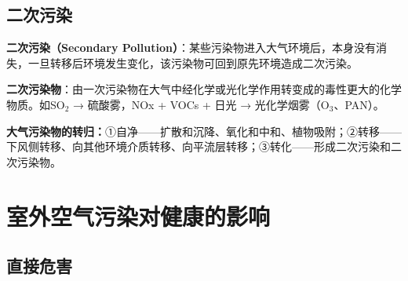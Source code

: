 \documentclass[10pt,a4paper,oneside]{ctexbook}
\begin{document}
\subsection{二次污染}

\begin{defbox}
\textbf{二次污染（Secondary Pollution）}：某些污染物进入大气环境后，本身没有消失，一旦转移后环境发生变化，该污染物可回到原先环境造成二次污染。

\textbf{二次污染物}：由一次污染物在大气中经化学或光化学作用转变成的毒性更大的化学物质。如SO$_2$ → 硫酸雾，NOx + VOCs + 日光 → 光化学烟雾（O$_3$、PAN）。

\textbf{大气污染物的转归：}①自净——扩散和沉降、氧化和中和、植物吸附；②转移——下风侧转移、向其他环境介质转移、向平流层转移；③转化——形成二次污染和二次污染物。
\end{defbox}

\section{室外空气污染对健康的影响}

\subsection{直接危害}
\end{document}
